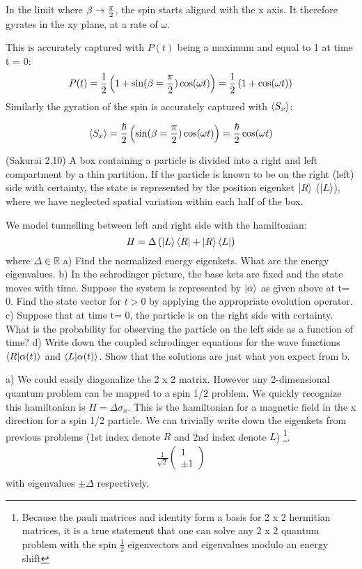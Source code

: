 \documentclass[10pt]{scrartcl}
\begin{document}
In the limit where $\beta \rightarrow {\pi \over 2}$, the spin starts aligned with the x axis.  It therefore gyrates in the xy plane, at a rate of $\omega$.

This is accurately captured with $P(t)$ being a maximum and equal  to 1 at time t = 0:
\[ P(t) =  \frac12 \left(1 + \sin(\beta = {\pi \over 2}) \cos(\omega t) \right) = 
\frac12 \left(1 +  \cos(\omega t) \right) \]
Similarly the gyration of the spin is accurately captured with $\braket{S_x}$:

\[ \braket{S_x} = {\hbar \over 2} \left( \sin(\beta={\pi \over 2}) \cos( \omega t) \right) = {\hbar \over 2} \cos(\omega t) \]

\newpage
\begin{myquestion}
	(Sakurai 2.10)  A box containing a particle is divided into a right and left compartment by a thin partition.
	If the particle is known to be on the right (left) side with certainty, the state is represented by the position eigenket $\ket{R}$ ($\ket{L}$), where we have neglected spatial variation within each half of the box.
	
	We model tunnelling between left and right side with the hamiltonian:
	\[H = \Delta \left(\ket{L} \bra{R} + \ket{R} \bra{L} \right) \]
	where $\Delta \in \mathbb{R}$
	a) Find the normalized energy eigenkets.  What are the energy eigenvalues.
	b) In the schrodinger picture, the base kets are fixed and the state moves with time.  Suppose the system is represented by $\ket{\alpha}$ as given above at t= 0.  Find the state vector for $t > 0$ by applying the appropriate evolution operator.
	c)  Suppose that at time t= 0, the particle is on the right side with certainty.  What is the probability for observing the particle on the left side as a function of time?
	d)  Write down the coupled schrodinger equations for the wave functions $\braket{R| \alpha(t)}$ and $\braket{L| \alpha(t)}$.  Show that the solutions are just what you expect from b.
	\end{myquestion}

a) We could easily diagonalize the 2 x 2 matrix.  However any 2-dimensional quantum problem can be mapped to a spin 1/2 problem. We quickly recognize this hamiltonian is $H = \Delta \sigma_x$.  This is the hamiltonian for a magnetic field in the x direction for a spin 1/2 particle.  We can trivially write down the eigenkets from previous problems (1st index denote $R$ and 2nd index denote $L$) \footnote{Because the pauli matrices and identity form a basis for 2 x 2 hermitian matrices, it is a true statement that one can solve any 2 x 2 quantum problem with the spin $\frac12$ eigenvectors and eigenvalues modulo an energy shift}.
\begin{align}
	\frac{1}{\sqrt{2}}
	\begin{pmatrix}
		1 \\
	\pm 1
	\end{pmatrix} \\
	\end{align}
with eigenvalues $\pm \Delta$ respectively. 
\end{document}
